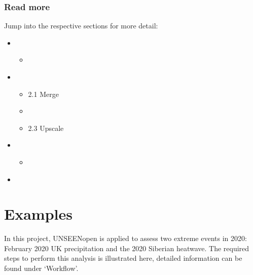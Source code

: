 \documentclass[letterpaper,10pt,english]{sphinxmanual}
\begin{document}
\subsection{Read more}
\label{\detokenize{Notebooks/Workflow:Read-more}}
Jump into the respective sections for more detail:
\begin{itemize}
\item {} 
\begin{itemize}
\item {} 
{\hyperref[\detokenize{Notebooks/1.Download/1.Retrieve::doc}]{}}

\end{itemize}

\item {} 
\begin{itemize}
\item {} 
2.1 Merge

\item {} 

\item {} 
2.3 Upscale

\end{itemize}

\item {} 
\begin{itemize}
\item {} 
{\hyperref[\detokenize{Notebooks/3.Evaluate/3.Evaluate::doc}]{}}

\end{itemize}

\item {} 

\end{itemize}

{
\begin{sphinxVerbatim}[commandchars=\\\{\}]
\llap{\color{nbsphinxin}[ ]:\,\hspace{\fboxrule}\hspace{\fboxsep}}
\end{sphinxVerbatim}
}


\chapter{Examples}
\label{\detokenize{Notebooks/Examples:Examples}}\label{\detokenize{Notebooks/Examples::doc}}
In this project, UNSEEN\sphinxhyphen{}open is applied to assess two extreme events in 2020: February 2020 UK precipitation and the 2020 Siberian heatwave. The required steps to perform this analysis is illustrated here, detailed information can be found under ‘Workflow’.
\end{document}
